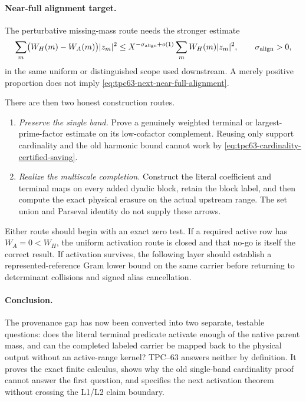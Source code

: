 \paragraph{Near-full alignment target.}
The perturbative missing-mass route needs the stronger estimate
\begin{equation}
 \sum_m\bigl(W_H(m)-W_A(m)\bigr)|z_m|^2
 \le X^{-\sigma_{\rm align}+o(1)}
       \sum_mW_H(m)|z_m|^2,
 \qquad \sigma_{\rm align}>0,
 \label{eq:tpc63-next-near-full-alignment}
\end{equation}
in the same uniform or distinguished scope used downstream.  A merely
positive proportion does not imply
\eqref{eq:tpc63-next-near-full-alignment}.

There are then two honest construction routes.
\begin{enumerate}[label=\textbf{Route \arabic*.},leftmargin=4.3em]
 \item \emph{Preserve the single band.}  Prove a genuinely weighted
       terminal or largest-prime-factor estimate on its low-cofactor
       complement.  Reusing only support cardinality and the old harmonic
       bound cannot work by
       \eqref{eq:tpc63-cardinality-certified-saving}.
 \item \emph{Realize the multiscale completion.}  Construct the literal
       coefficient and terminal maps on every added dyadic block, retain
       the block label, and then compute the exact physical erasure on the
       actual upstream range.  The set union and Parseval identity do not
       supply these arrows.
\end{enumerate}

Either route should begin with an exact zero test.  If a required active
row has \(W_A=0<W_H\), the uniform activation route is closed and that
no-go is itself the correct result.  If activation survives, the following
layer should establish a represented-reference Gram lower bound on the
same carrier before returning to determinant collisions and signed alias
cancellation.

\paragraph{Conclusion.}
The provenance gap has now been converted into two separate, testable
questions: does the literal terminal predicate activate enough of the
native parent mass, and can the completed labeled carrier be mapped back
to the physical output without an active-range kernel?  TPC--63 answers
neither by definition.  It proves the exact finite calculus, shows why the
old single-band cardinality proof cannot answer the first question, and
specifies the next activation theorem without crossing the L1/L2 claim
boundary.
